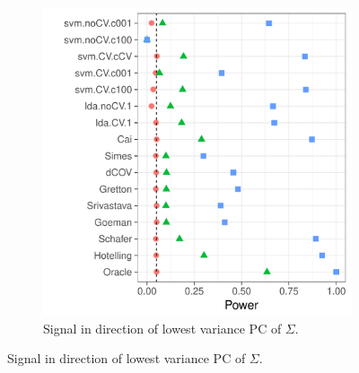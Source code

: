 \documentclass[onecolumn,draftclsnofoot]{IEEEtran}
\begin{document}
\begin{figure}[h]
\begin{subfigure}[t]{.45\columnwidth}
		\includegraphics[width=1\columnwidth]{"art/file21"}
		\caption{Signal in direction of lowest variance PC of $\Sigma$.} 
		\label{fig:dependence_12}
	\end{subfigure}
\end{figure}
\end{document}
